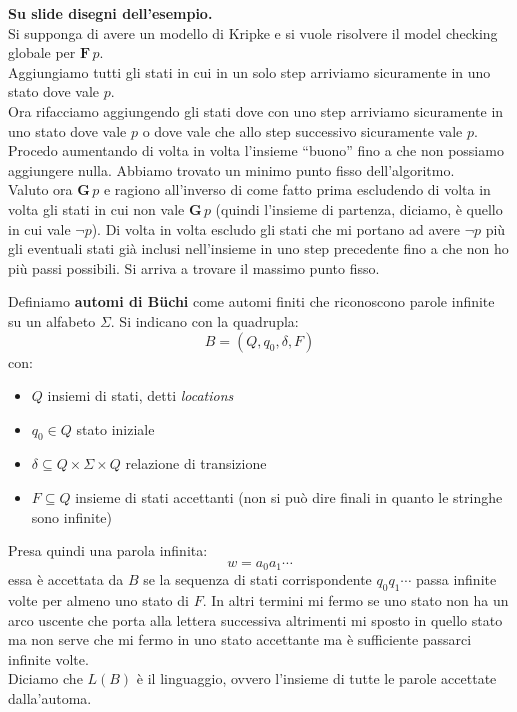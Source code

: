 \begin{esempio}
  \textbf{Su slide disegni dell'esempio.}\\
  Si supponga di avere un modello di Kripke e si vuole risolvere il model
  checking globale per $\mathbf{F}\, p$.\\
  Aggiungiamo tutti gli stati in cui in un solo step arriviamo sicuramente in
  uno stato dove vale $p$. \\
  Ora rifacciamo aggiungendo gli stati dove con uno step arriviamo sicuramente
  in uno stato dove vale $p$ o dove vale che allo step successivo sicuramente
  vale $p$. Procedo aumentando di volta in volta l'insieme ``buono'' fino a che
  non possiamo aggiungere nulla. Abbiamo trovato un minimo punto fisso
  dell'algoritmo. \\
  Valuto ora $\mathbf{G}\, p$ e ragiono all'inverso di come fatto prima
  escludendo di volta in volta gli stati in cui non vale $\mathbf{G}\, p$ (quindi
  l'insieme di partenza, diciamo, è quello in cui vale $\neg p$). Di volta in
  volta escludo gli stati che mi portano ad avere $\neg p$ più gli eventuali
  stati già inclusi nell'insieme in uno step precedente fino a che non ho più
  passi possibili. Si arriva a trovare il massimo punto fisso.
\end{esempio}
\begin{definizione}
  Definiamo \textbf{automi di B\"{u}chi} come automi finiti che riconoscono
  parole infinite su un alfabeto $\Sigma$. Si indicano con la quadrupla:
  \[B=(Q, q_0,\delta, F)\]
  con:
  \begin{itemize}
    \item $Q$ insiemi di stati, detti \textit{locations}
    \item $q_0\in Q$ stato iniziale
    \item $\delta\subseteq Q\times \Sigma\times Q$ relazione di transizione
    \item $F\subseteq Q$ insieme di stati accettanti (non si può dire finali in
    quanto le stringhe sono infinite)
  \end{itemize}
  Presa quindi una parola infinita:
  \[w=a_0a_1\cdots\]
  essa è accettata da $B$ se la sequenza di stati corrispondente $q_0q_1\cdots$
  passa infinite volte per almeno uno stato di $F$. In altri termini mi fermo se
  uno stato non ha un arco uscente che porta alla lettera successiva altrimenti
  mi sposto in quello stato ma non serve che mi fermo in uno stato accettante ma
  è sufficiente passarci infinite volte.\\
  Diciamo che $L(B)$ è il linguaggio, ovvero l'insieme di tutte le parole
  accettate dalla'automa.
\end{definizione}
